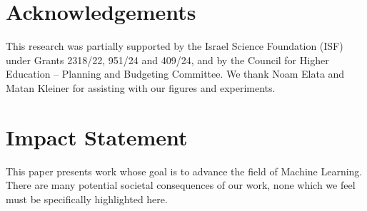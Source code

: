 
\section*{Acknowledgements}
This research was partially supported by the Israel Science Foundation (ISF) under Grants 2318/22, 951/24 and 409/24, and by the Council for Higher Education – Planning and Budgeting Committee.
We thank Noam Elata and Matan Kleiner for assisting with our figures and experiments.

\section*{Impact Statement}
This paper presents work whose goal is to advance the field of Machine Learning.
There are many potential societal consequences of our work, none which we feel must be specifically highlighted here.